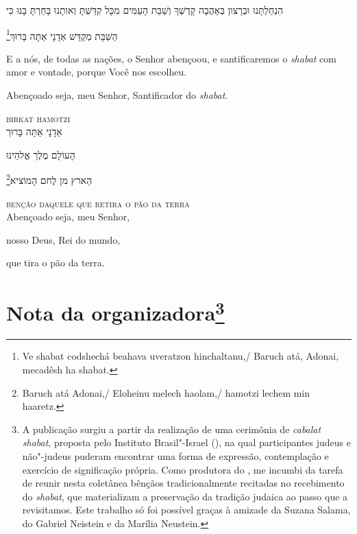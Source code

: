 הִנְחַלְתָּנוּ וּבְרָצון בְּאַהֲבָה קָדְשְׁךָ וְשַׁבַּת הָעַמִּים מִכָּל קִדַּשְׁתָּ וְאותָנוּ בָחַרְתָּ בָנוּ כִּי
\medskip

\footnote{Ve shabat codshechá beahava uveratzon hinchaltanu,/
Baruch atá, Adonai, mecadêsh ha shabat.}הַשַּׁבָּת מְקַדֵּשׁ אַדָנָי אַתָּה בָּרוּךְ

\movetooddpage
\raggedright

\vspace*{1cm}

E a nós, de todas as nações, o Senhor abençoou, e santificaremos o \textit{shabat} com amor e vontade, porque 
Você nos escolheu.\medskip

Abençoado seja, meu Senhor, Santificador do \textit{shabat}.

\movetoevenpage
\raggedleft



\textsc{birkat hamotzi}\\[15pt]

אַדָנָי אַתָּה בָּרוּך

הָעוֹלָם מֶלֶך אֱלהֵינוּ 

\footnote{Baruch atá Adonai,/ Eloheinu melech haolam,/ hamotzi lechem min haaretz.}הַארץ מן לֶחם הָמוֹציא

\movetooddpage
\raggedright


\textsc{benção daquele que retira o pão da terra}\\[15pt]

Abençoado seja, meu Senhor,

nosso Deus, Rei do mundo,

que tira o pão da terra.




\chapter*{Nota da organizadora\footnote{ 
	A publicação surgiu a partir da realização de uma cerimônia de 
	\emph{cabalat shabat}, proposta pelo Instituto Brasil"-Israel (), na qual participantes judeus e não"-judeus puderam encontrar uma forma de expressão, contemplação e exercício de significação própria. Como produtora do , me incumbi da tarefa de reunir nesta coletânea bênçãos tradicionalmente recitadas no recebimento do \emph{shabat}, que materializam a preservação da tradição judaica ao passo que a revisitamos.
	Este trabalho só foi possível graças à amizade da Suzana Salama, do Gabriel Neistein e da Marília Neustein.} }


